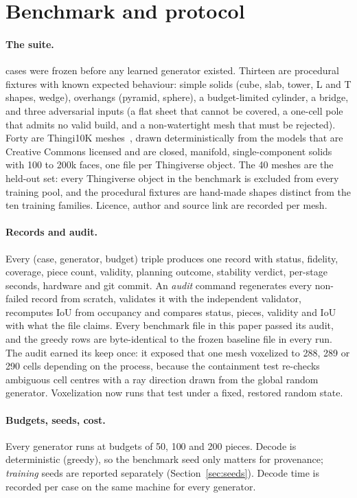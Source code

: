 \section{Benchmark and protocol}
\label{sec:benchmark}

\paragraph{The suite.} \nCases{} cases were frozen before any learned generator existed. Thirteen are procedural
fixtures with known expected behaviour: simple solids (cube, slab, tower, L and T shapes, wedge), overhangs (pyramid,
sphere), a budget-limited cylinder, a bridge, and three adversarial inputs (a flat sheet that cannot be covered, a
one-cell pole that admits no valid build, and a non-watertight mesh that must be rejected). Forty are Thingi10K
meshes~\citep{zhou2016thingi10k}, drawn deterministically from the models that are Creative Commons licensed and are
closed, manifold, single-component solids with 100 to 200k faces, one file per Thingiverse object. The 40 meshes
are the held-out set: every Thingiverse object in the benchmark is excluded from every training pool, and the
procedural fixtures are hand-made shapes distinct from the ten training families. Licence, author and source link are
recorded per mesh.

\paragraph{Records and audit.} Every (case, generator, budget) triple produces one record with status, fidelity,
coverage, piece count, validity, planning outcome, stability verdict, per-stage seconds, hardware and git commit.
An \emph{audit} command regenerates every non-failed record from scratch, validates it with the independent
validator, recomputes IoU from occupancy and compares status, pieces, validity and IoU with what the file claims. Every
benchmark file in this paper passed its audit, and the greedy rows are byte-identical to the frozen baseline file in
every run. The audit earned its keep once: it exposed that one mesh voxelized to 288, 289 or 290 cells depending on
the process, because the containment test re-checks ambiguous cell centres with a ray direction drawn from the global
random generator. Voxelization now runs that test under a fixed, restored random state.

\paragraph{Budgets, seeds, cost.} Every generator runs at budgets of 50, 100 and 200 pieces. Decode is deterministic
(greedy), so the benchmark seed only matters for provenance; \emph{training} seeds are reported separately
(Section~\ref{sec:seeds}). Decode time is recorded per case on the same machine for every generator.

